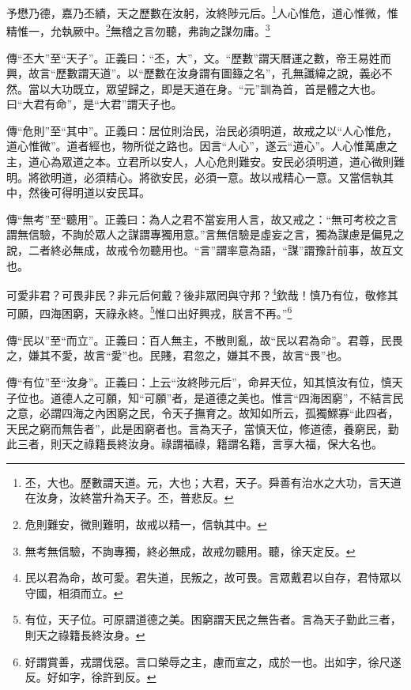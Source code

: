予懋乃德，嘉乃丕績，天之歷數在汝躬，汝終陟元后。\footnote{丕，大也。歷數謂天道。元，大也；大君，天子。舜善有治水之大功，言天道在汝身，汝終當升為天子。丕，普悲反。}人心惟危，道心惟微，惟精惟一，允執厥中。\footnote{危則難安，微則難明，故戒以精一，信執其中。}無稽之言勿聽，弗詢之謀勿庸。\footnote{無考無信驗，不詢專獨，終必無成，故戒勿聽用。聽，徐天定反。}

{\noindent\zhuan{}\fzbyks 傳“丕大”至“天子”。正義曰：“丕，大”，文。“歷數”謂天曆運之數，帝王易姓而興，故言“歷數謂天道”。以“歷數在汝身謂有圖籙之名”，孔無讖緯之說，義必不然。當以大功既立，眾望歸之，即是天道在身。“元”訓為首，首是體之大也。曰“大君有命”，是“大君”謂天子也。 \par}

{\noindent\zhuan{}\fzbyks 傳“危則”至“其中”。正義曰：居位則治民，治民必須明道，故戒之以“人心惟危，道心惟微”。道者經也，物所從之路也。因言“人心”，遂云“道心”。人心惟萬慮之主，道心為眾道之本。立君所以安人，人心危則難安。安民必須明道，道心微則難明。將欲明道，必須精心。將欲安民，必須一意。故以戒精心一意。又當信執其中，然後可得明道以安民耳。 \par}

{\noindent\zhuan{}\fzbyks 傳“無考”至“聽用”。正義曰：為人之君不當妄用人言，故又戒之：“無可考校之言謂無信驗，不詢於眾人之謀謂專獨用意。”言無信驗是虛妄之言，獨為謀慮是偏見之說，二者終必無成，故戒令勿聽用也。“言”謂率意為語，“謀”謂豫計前事，故互文也。 \par}

可愛非君？可畏非民？非元后何戴？後非眾罔與守邦？\footnote{民以君為命，故可愛。君失道，民叛之，故可畏。言眾戴君以自存，君恃眾以守國，相須而立。}欽哉！慎乃有位，敬修其可願，四海困窮，天祿永終。\footnote{有位，天子位。可原謂道德之美。困窮謂天民之無告者。言為天子勤此三者，則天之祿籍長終汝身。}惟口出好興戎，朕言不再。”\footnote{好謂賞善，戎謂伐惡。言口榮辱之主，慮而宣之，成於一也。出如字，徐尺遂反。好如字，徐許到反。}

{\noindent\zhuan{}\fzbyks 傳“民以”至“而立”。正義曰：百人無主，不散則亂，故“民以君為命”。君尊，民畏之，嫌其不愛，故言“愛”也。民賤，君忽之，嫌其不畏，故言“畏”也。 \par}

{\noindent\zhuan{}\fzbyks 傳“有位”至“汝身”。正義曰：上云“汝終陟元后”，命昇天位，知其慎汝有位，慎天子位也。道德人之可願，知“可願”者，是道德之美也。惟言“四海困窮”，不結言民之意，必謂四海之內困窮之民，令天子撫育之。故知如所云，孤獨鰥寡“此四者，天民之窮而無告者”，此是困窮者也。言為天子，當慎天位，修道德，養窮民，勤此三者，則天之祿籍長終汝身。祿謂福祿，籍謂名籍，言享大福，保大名也。 \par}

